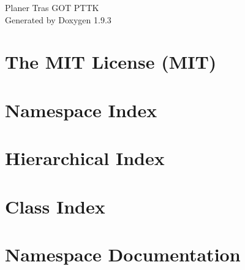 \documentclass[twoside]{book}
\newcommand{\+}{\discretionary{\mbox{\scriptsize$\hookleftarrow$}}{}{}}
\newcommand{\clearemptydoublepage}{%
    \newpage{\pagestyle{empty}\cleardoublepage}%
  }
\begin{document}
  \raggedbottom
  \begin{titlepage}
  \vspace*{7cm}
  \begin{center}%
  {\Large Planer Tras GOT PTTK}\\
  \vspace*{1cm}
  {\large Generated by Doxygen 1.9.3}\\
  \end{center}
  \end{titlepage}
  \clearemptydoublepage
  \tableofcontents
  \clearemptydoublepage
\chapter{The MIT License (MIT)}
\label{md_wwwroot_lib_jquery_validation__l_i_c_e_n_s_e}

\chapter{Namespace Index}

\chapter{Hierarchical Index}

\chapter{Class Index}

\chapter{Namespace Documentation}















\end{document}
